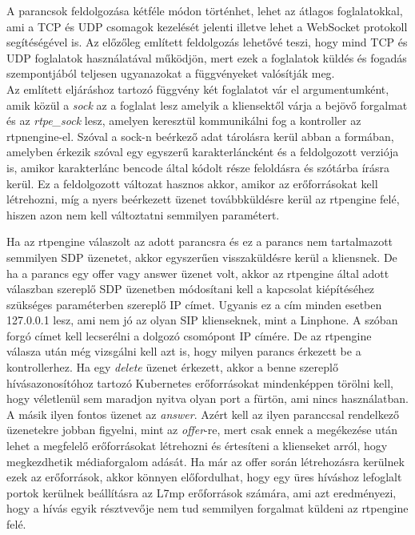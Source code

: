 A parancsok feldolgozása kétféle módon történhet, lehet az átlagos foglalatokkal, ami 
a TCP és UDP csomagok kezelését jelenti illetve lehet a WebSocket protokoll segítéségével 
is. Az előzőleg említett feldolgozás lehetővé teszi, hogy mind TCP és UDP
foglalatok használatával működjön, mert ezek a foglalatok küldés és fogadás szempontjából
teljesen ugyanazokat a függvényeket valósítják meg. \\

Az említett eljáráshoz tartozó függvény két foglalatot vár el argumentumként, amik közül 
a \textit{sock} az a foglalat lesz amelyik a kliensektől várja a bejövő forgalmat és az 
\textit{rtpe\_sock} lesz, amelyen keresztül kommunikálni fog a kontroller az rtpnengine-el. 
Szóval a sock-n beérkező adat tárolásra kerül abban a formában, amelyben érkezik szóval 
egy egyszerű karakterláncként és a feldolgozott verziója is, amikor karakterlánc bencode 
által kódolt része feloldásra és szótárba írásra kerül. Ez a feldolgozott változat hasznos 
akkor, amikor az erőforrásokat kell létrehozni, míg a nyers beérkezett üzenet továbbküldésre 
kerül az rtpengine felé, hiszen azon nem kell változtatni semmilyen paramétert.

Ha az rtpengine válaszolt az adott parancsra és ez a parancs nem tartalmazott semmilyen 
SDP üzenetet, akkor egyszerűen visszaküldésre kerül a kliensnek. De ha a parancs egy offer
vagy answer üzenet volt, akkor az rtpengine által adott válaszban szereplő SDP üzenetben
módosítani kell a kapcsolat kiépítéséhez szükséges paraméterben szereplő IP címet. Ugyanis
ez a cím minden esetben 127.0.0.1 lesz, ami nem jó az olyan SIP klienseknek, mint a Linphone.
A szóban forgó címet kell lecserélni a dolgozó csomópont IP címére. De az rtpengine 
válasza után még vizsgálni kell azt is, hogy milyen parancs érkezett be a kontrollerhez. 
Ha egy \textit{delete} üzenet érkezett, akkor a benne szereplő hívásazonosítóhoz tartozó
Kubernetes erőforrásokat mindenképpen törölni kell, hogy véletlenül sem maradjon nyitva
olyan port a fürtön, ami nincs használatban. A másik ilyen fontos üzenet az \textit{answer}.
Azért kell az ilyen paranccsal rendelkező üzenetekre jobban figyelni, mint az \textit{offer}-re,
mert csak ennek a megékezése után lehet a megfelelő erőforrásokat létrehozni és értesíteni
a klienseket arról, hogy megkezdhetik médiaforgalom adását. Ha már az offer során 
létrehozásra kerülnek ezek az erőforrások, akkor könnyen előfordulhat, hogy egy üres híváshoz
lefoglalt portok kerülnek beállításra az L7mp erőforrások számára, ami azt eredményezi, hogy
a hívás egyik résztvevője nem tud semmilyen forgalmat küldeni az rtpengine felé.